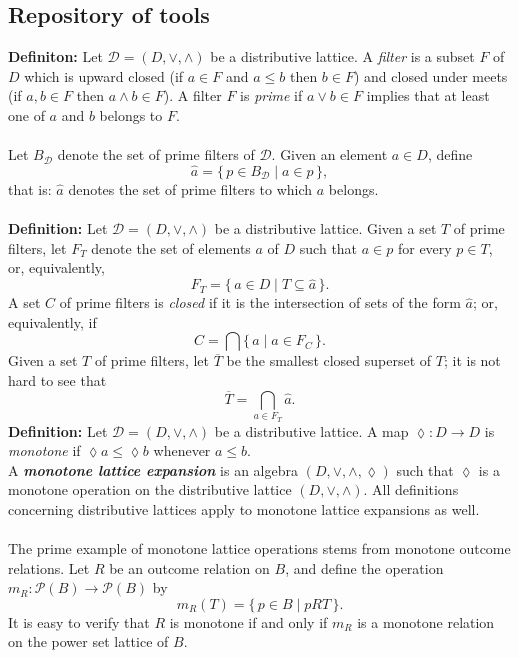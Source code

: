 \documentclass[12pt]{article}
\begin{document}
\subsection{Repository of tools}

\textbf{Definiton:} Let $\mathcal{D} = (D, \vee, \wedge)$ be a distributive lattice. 
A \emph{filter} is a subset $F$ of $D$ which is upward closed 
(if $a \in F$ and $a \leq b$ then $b \in F$) and closed under meets 
(if $a, b \in F$ then $a \wedge b \in F$). 
A filter $F$ is \emph{prime} if $a \vee b \in F$ implies that at least one 
of $a$ and $b$ belongs to $F$. \\ \\
Let $B_{\mathcal{D}}$ denote the set of prime filters of $\mathcal{D}$.  
Given an element $a \in D$, define
\[
\hat{a} = \{\, p \in B_{\mathcal{D}} \mid a \in p \,\},
\]
that is: $\hat{a}$ denotes the set of prime filters to which $a$ belongs. \\ \\
\textbf{Definition:}
Let $\mathcal{D} = (D, \vee, \wedge)$ be a distributive lattice. 
Given a set $T$ of prime filters, let $F_T$ denote the set of elements 
$a$ of $D$ such that $a \in p$ for every $p \in T$, or, equivalently,
\[
   F_T = \{\, a \in D \mid T \subseteq \hat{a} \,\}.
\]
A set $C$ of prime filters is \emph{closed} if it is the intersection of 
sets of the form $\hat{a}$; or, equivalently, if 
\[
   C = \bigcap \{\, \hat{a} \mid a \in F_C \,\}.
\]
Given a set $T$ of prime filters, let $\overline{T}$ be the smallest 
closed superset of $T$; it is not hard to see that 
\[
   \overline{T} = \bigcap_{a \in F_T} \hat{a}. 
   \]
\textbf{Definition:} Let $\mathcal{D} = (D, \vee, \wedge)$ be a distributive lattice. 
A map $\lozenge : D \to D$ is \emph{monotone} if $\lozenge a \leq \lozenge b$ whenever $a \leq b$. \\
A \textbf{\emph{monotone lattice expansion}} is an algebra $(D, \vee, \wedge, \lozenge)$ such that $\lozenge$ is a monotone operation on the distributive lattice $(D, \vee, \wedge)$.  
All definitions concerning distributive lattices apply to monotone lattice expansions as well. \\ \\
The prime example of monotone lattice operations stems from monotone 
outcome relations. Let $R$ be an outcome relation on $B$, and define the 
operation $m_R : \mathcal{P}(B) \to \mathcal{P}(B)$ by
\[
m_R(T) = \{\, p \in B \mid pRT \,\}.
\]
It is easy to verify that $R$ is monotone if and only if $m_R$ is a monotone 
relation on the power set lattice of $B$. \\ \\
\end{document}
